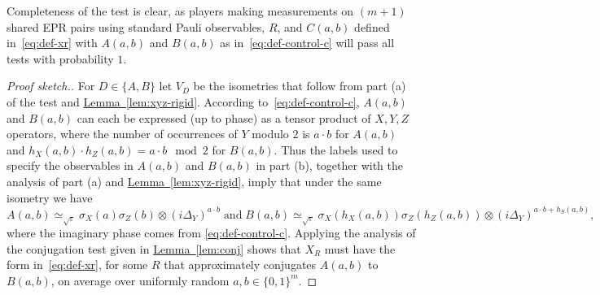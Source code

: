 \documentclass[11pt]{article}
\numberwithin{equation}{section}
\theoremstyle{definition}
\theoremstyle{plain}
\newcommand{\expref}[2]{\hyperref[#2]{#1~\ref{#2}}}
\newcommand{\eps}{\varepsilon}
\begin{document}
 Completeness of the test is clear, as players making measurements on $(m+1)$ shared EPR pairs using standard Pauli observables, $R$, and $C(a,b)$ defined in~\eqref{eq:def-xr} with $A(a,b)$ and $B(a,b)$ as in~\eqref{eq:def-control-c} will pass all tests with probability $1$.  

\begin{proof}[Proof sketch.]
For $D\in\{A,B\}$ let $V_D$ be the isometries that follow from part (a) of the test and \expref{Lemma}{lem:xyz-rigid}.
According to~\eqref{eq:def-control-c}, $A(a,b)$ and $B(a,b)$ can each be expressed (up to phase) as a tensor product of $X,Y,Z$ operators, where the number of occurrences of $Y$ modulo $2$ is $a\cdot b$ for $A(a,b)$ and  $h_X(a,b)\cdot h_Z(a,b) = a\cdot b\mod 2$ for $B(a,b)$. Thus the labels used to specify the observables in $A(a,b)$ and $B(a,b)$ in part (b), together with the analysis of part (a) and \expref{Lemma}{lem:xyz-rigid}, imply that under the same isometry we  have
$$A(a,b) \simeq_{\sqrt{\eps}} \sigma_X(a)\sigma_Z(b) \otimes (i\Delta_Y)^{a\cdot b}
\;\text{and}\;
 B(a,b) \simeq_{\sqrt{\eps}} \sigma_X(h_X(a,b)) \sigma_Z(h_Z(a,b)) \otimes (i\Delta_Y)^{a\cdot b + h_S(a,b)},$$
where the imaginary phase comes from \eqref{eq:def-control-c}. 
Applying the analysis of the conjugation test given in \expref{Lemma}{lem:conj} shows that $X_R$ must have the form in~\eqref{eq:def-xr}, for some $R$ that approximately conjugates $A(a,b)$ to $B(a,b)$, on average over uniformly random $a,b\in\{0,1\}^m$.


\end{proof}
\end{document}
